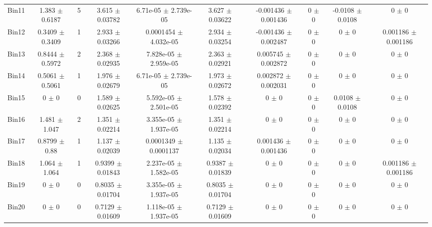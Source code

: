 \begin{tabular}{@{\extracolsep{4pt}}lccccccccc@{}}
     Bin11 & 1.383 $\pm$ 0.6187 & 5 & 3.615 $\pm$ 0.03782 & 6.71e-05 $\pm$ 2.739e-05 & 3.627 $\pm$ 0.03622 & -0.001436 $\pm$ 0.001436 & 0 $\pm$ 0 & -0.0108 $\pm$ 0.0108 & 0 $\pm$ 0 \\ 
     Bin12 & 0.3409 $\pm$ 0.3409 & 1 & 2.933 $\pm$ 0.03266 & 0.0001454 $\pm$ 4.032e-05 & 2.934 $\pm$ 0.03254 & -0.001436 $\pm$ 0.002487 & 0 $\pm$ 0 & 0 $\pm$ 0 & 0.001186 $\pm$ 0.001186 \\ 
     Bin13 & 0.8444 $\pm$ 0.5972 & 2 & 2.368 $\pm$ 0.02935 & 7.828e-05 $\pm$ 2.959e-05 & 2.363 $\pm$ 0.02921 & 0.005745 $\pm$ 0.002872 & 0 $\pm$ 0 & 0 $\pm$ 0 & 0 $\pm$ 0 \\ 
     Bin14 & 0.5061 $\pm$ 0.5061 & 1 & 1.976 $\pm$ 0.02679 & 6.71e-05 $\pm$ 2.739e-05 & 1.973 $\pm$ 0.02672 & 0.002872 $\pm$ 0.002031 & 0 $\pm$ 0 & 0 $\pm$ 0 & 0 $\pm$ 0 \\ 
     Bin15 & 0 $\pm$ 0 & 0 & 1.589 $\pm$ 0.02625 & 5.592e-05 $\pm$ 2.501e-05 & 1.578 $\pm$ 0.02392 & 0 $\pm$ 0 & 0 $\pm$ 0 & 0.0108 $\pm$ 0.0108 & 0 $\pm$ 0 \\ 
     Bin16 & 1.481 $\pm$ 1.047 & 2 & 1.351 $\pm$ 0.02214 & 3.355e-05 $\pm$ 1.937e-05 & 1.351 $\pm$ 0.02214 & 0 $\pm$ 0 & 0 $\pm$ 0 & 0 $\pm$ 0 & 0 $\pm$ 0 \\ 
     Bin17 & 0.8799 $\pm$ 0.88 & 1 & 1.137 $\pm$ 0.02039 & 0.0001349 $\pm$ 0.0001137 & 1.135 $\pm$ 0.02034 & 0.001436 $\pm$ 0.001436 & 0 $\pm$ 0 & 0 $\pm$ 0 & 0 $\pm$ 0 \\ 
     Bin18 & 1.064 $\pm$ 1.064 & 1 & 0.9399 $\pm$ 0.01843 & 2.237e-05 $\pm$ 1.582e-05 & 0.9387 $\pm$ 0.01839 & 0 $\pm$ 0 & 0 $\pm$ 0 & 0 $\pm$ 0 & 0.001186 $\pm$ 0.001186 \\ 
     Bin19 & 0 $\pm$ 0 & 0 & 0.8035 $\pm$ 0.01704 & 3.355e-05 $\pm$ 1.937e-05 & 0.8035 $\pm$ 0.01704 & 0 $\pm$ 0 & 0 $\pm$ 0 & 0 $\pm$ 0 & 0 $\pm$ 0 \\ 
     Bin20 & 0 $\pm$ 0 & 0 & 0.7129 $\pm$ 0.01609 & 1.118e-05 $\pm$ 1.937e-05 & 0.7129 $\pm$ 0.01609 & 0 $\pm$ 0 & 0 $\pm$ 0 & 0 $\pm$ 0 & 0 $\pm$ 0 \\ 
\hline\hline
  \end{tabular}
